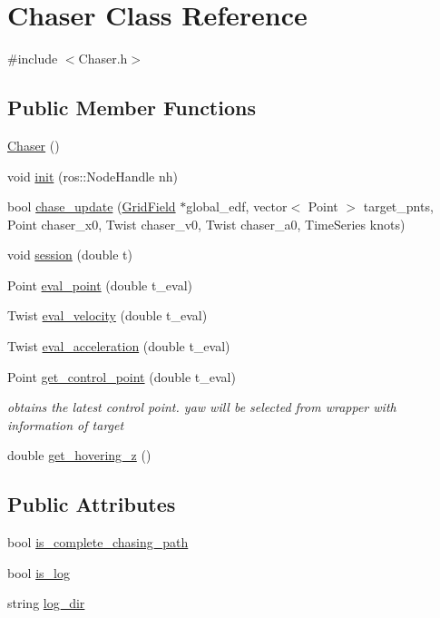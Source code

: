 \hypertarget{class_chaser}{}\section{Chaser Class Reference}
\label{class_chaser}


{\ttfamily \#include $<$Chaser.\+h$>$}

\subsection*{Public Member Functions}
\begin{DoxyCompactItemize}
\item 
\hyperlink{class_chaser_ae1179fa7b77db9c80468f88222e32f09}{Chaser} ()
\item 
void \hyperlink{class_chaser_a3538485980643e885755608e4297d1f6}{init} (ros\+::\+Node\+Handle nh)
\item 
bool \hyperlink{class_chaser_a8feeca68466b9b4576ee9c99b624dfc5}{chase\+\_\+update} (\hyperlink{struct_grid_field}{Grid\+Field} $\ast$global\+\_\+edf, vector$<$ Point $>$ target\+\_\+pnts, Point chaser\+\_\+x0, Twist chaser\+\_\+v0, Twist chaser\+\_\+a0, Time\+Series knots)
\item 
void \hyperlink{class_chaser_a7d736728bb5327acf0d334d7d4b1b844}{session} (double t)
\item 
Point \hyperlink{class_chaser_a6dca60b8af1c63eff3235515255cf355}{eval\+\_\+point} (double t\+\_\+eval)
\item 
Twist \hyperlink{class_chaser_a208374e7b85f9a35c1c00ec4f1ec65c3}{eval\+\_\+velocity} (double t\+\_\+eval)
\item 
Twist \hyperlink{class_chaser_a2fe36102d5a9befcb4c6ada3375260ed}{eval\+\_\+acceleration} (double t\+\_\+eval)
\item 
Point \hyperlink{class_chaser_a7a42e3dd3ca45e343652318e591f87d1}{get\+\_\+control\+\_\+point} (double t\+\_\+eval)
\begin{DoxyCompactList}\small\item\em obtains the latest control point. yaw will be selected from wrapper with information of target \end{DoxyCompactList}\item 
double \hyperlink{class_chaser_aaa7ce7ea18761dd1513cf9e85c6b4e48}{get\+\_\+hovering\+\_\+z} ()
\end{DoxyCompactItemize}
\subsection*{Public Attributes}
\begin{DoxyCompactItemize}
\item 
bool \hyperlink{class_chaser_a53af032471ad6bdc828c4eae78085813}{is\+\_\+complete\+\_\+chasing\+\_\+path}
\item 
bool \hyperlink{class_chaser_a33b880dd48d1d983001fa93ba1a1184f}{is\+\_\+log}
\item 
string \hyperlink{class_chaser_a9d9ad4c7ca00bcda38d2bc809f3e7654}{log\+\_\+dir}
\end{DoxyCompactItemize}


